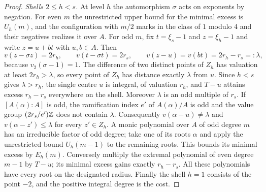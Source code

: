 \begin{proof}
\emph{Shells $2\le h<s$.} At level $h$ the automorphism $\sigma$ acts on exponents by
negation. For even $m$ the unrestricted upper bound for the minimal excess is $U_h(m)$, and
the configuration with $m/2$ marks in the class of $1$ modulo $4$ and their negatives
realizes it over $A$. For odd $m$, fix $t=\xi_s-1$ and $z=\xi_h-1$ and write $z=u+bt$ with
$u,b\in A$. Then
\[
 v(z-\sigma z)=2r_h,\qquad v(t-\sigma t)=2r_s,\qquad v(z-u)=v(bt)=2r_h-r_s=:\lambda,
\]
because $v_2(\sigma-1)=1$. The difference of two distinct points of $Z_h$ has valuation at
least $2r_h>\lambda$, so every point of $Z_h$ has distance exactly $\lambda$ from $u$. Since
$h<s$ gives $\lambda>r_h$, the single centre $u$ is integral, of valuation $r_h$, and
$T-u$ attains excess $r_h-r_s$ everywhere on the shell. Moreover $\lambda$ is an odd
multiple of $r_s$. If $[A(\alpha):A]$ is odd, the ramification index $e'$ of $A(\alpha)/A$
is odd and the value group $(2r_s/e')\mathbb{Z}$ does not contain $\lambda$. Consequently
$v(\alpha-u)\ne\lambda$ and $v(\alpha-z')\le\lambda$ for every $z'\in Z_h$. A monic
polynomial over $A$ of odd degree $m$ has an irreducible factor of odd degree; take one of
its roots $\alpha$ and apply the unrestricted bound $U_h(m-1)$ to the remaining roots. This
bounds its minimal excess by $E_h(m)$. Conversely multiply the extremal polynomial of even
degree $m-1$ by $T-u$; its minimal excess gains exactly $r_h-r_s$. All these polynomials
have every root on the designated radius. Finally the shell $h=1$ consists of the point
$-2$, and the positive integral degree is the cost.
\end{proof}

